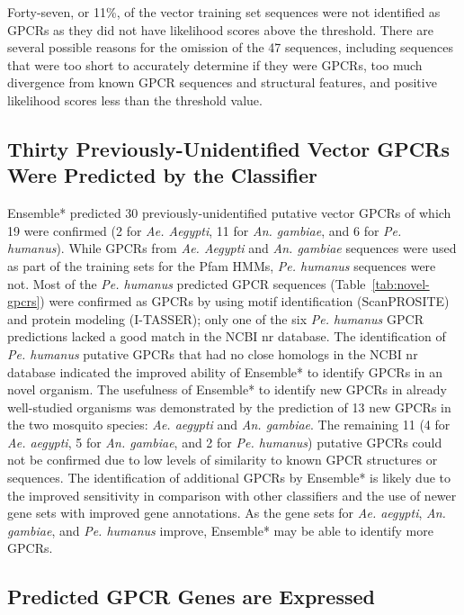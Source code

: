 Forty-seven, or 11\%, of the vector training set sequences were not identified as GPCRs as they did not have likelihood scores above the threshold. There are several possible reasons for the omission of the 47 sequences, including sequences that were too short to accurately determine if they were GPCRs, too much divergence from known GPCR sequences and structural features, and positive likelihood scores less than the threshold value.


\subsection{Thirty Previously-Unidentified Vector GPCRs Were Predicted by the Classifier}

Ensemble* predicted 30 previously-unidentified putative vector GPCRs of which 19 were confirmed (2 for \emph{Ae. Aegypti}, 11 for \emph{An. gambiae}, and 6 for \emph{Pe. humanus}).  While GPCRs from \emph{Ae. Aegypti} and \emph{An. gambiae} sequences were used as part of the training sets for the Pfam HMMs, \emph{Pe. humanus} sequences were not.  Most of the \emph{Pe. humanus} predicted GPCR sequences (Table~\ref{tab:novel-gpcrs}) were confirmed as GPCRs by using motif identification (ScanPROSITE) and protein modeling (I-TASSER); only one of the six \emph{Pe. humanus} GPCR predictions lacked a good match in the NCBI nr database. The identification of \emph{Pe. humanus} putative GPCRs that had no close homologs in the NCBI nr database indicated the improved ability of Ensemble* to identify GPCRs in an novel organism. The usefulness of Ensemble* to identify new GPCRs in already well-studied organisms was demonstrated by the prediction of 13 new GPCRs in the two mosquito species: \emph{Ae. aegypti}  and \emph{An. gambiae}.  The remaining 11 (4 for \emph{Ae. aegypti}, 5 for \emph{An. gambiae}, and 2 for \emph{Pe. humanus}) putative GPCRs could not be confirmed due to low levels of similarity to known GPCR structures or sequences. The identification of additional GPCRs by Ensemble* is likely due to the improved sensitivity in comparison with other classifiers and the use of newer gene sets with improved gene annotations. As the gene sets for \emph{Ae. aegypti}, \emph{An. gambiae}, and \emph{Pe. humanus} improve, Ensemble* may be able to identify more GPCRs.

\subsection{Predicted GPCR Genes are Expressed}

